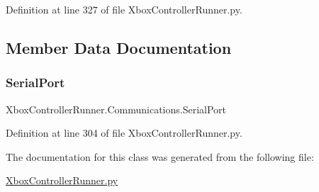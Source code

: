 Definition at line 327 of file Xbox\+Controller\+Runner.\+py.



\subsection{Member Data Documentation}
\mbox{\label{class_xbox_controller_runner_1_1_communications_a37dd3a39cfb67c171a4f639e9c24176a}} 
\subsubsection{\texorpdfstring{Serial\+Port}{SerialPort}}
{\footnotesize\ttfamily Xbox\+Controller\+Runner.\+Communications.\+Serial\+Port}



Definition at line 304 of file Xbox\+Controller\+Runner.\+py.



The documentation for this class was generated from the following file\+:\begin{DoxyCompactItemize}
\item 
\mbox{\hyperlink{_xbox_controller_runner_8py}{Xbox\+Controller\+Runner.\+py}}\end{DoxyCompactItemize}
